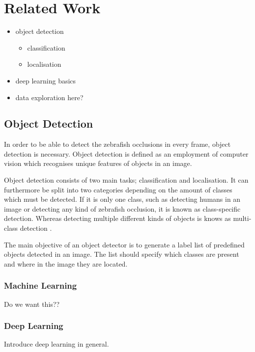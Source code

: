 \graphicspath{{figures/research/}}
\chapter{Related Work}\label{ch:related}

\begin{itemize}
	\item object detection
	\begin{itemize}
		\item classification
		\item localisation
	\end{itemize}
	\item deep learning basics
	\item data exploration here?
\end{itemize}

\section{Object Detection}
In order to be able to detect the zebrafish occlusions in every frame, object detection is necessary. Object detection is defined as an employment of computer vision which recognises unique features of objects in an image.

Object detection consists of two main tasks; classification and localisation. It can furthermore be split into two categories depending on the amount of classes which must be detected. If it is only one class, such as detecting humans in an image or detecting any kind of zebrafish occlusion, it is known as class-specific detection. Whereas detecting multiple different kinds of objects is knows as multi-class detection  \citep{Zhang2013}.

The main objective of an object detector is to generate a label list of predefined objects detected in an image. The list should specify which classes are present and where in the image they are located.\\

\todo{Indledning til enten machine- og deep learning, eller blot deep learning]}

\subsection{Machine Learning}
Do we want this??

\subsection{Deep Learning}
Introduce deep learning in general.\\

